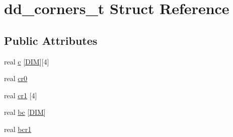 \hypertarget{structdd__corners__t}{\section{dd\-\_\-corners\-\_\-t \-Struct \-Reference}
\label{structdd__corners__t}
}
\subsection*{\-Public \-Attributes}
\begin{DoxyCompactItemize}
\item 
real \hyperlink{structdd__corners__t_a7a866a0d1a1e47f534f74f748600adc1}{c} \mbox{[}\hyperlink{share_2template_2gromacs_2types_2simple_8h_ac25189db92959bff3c6c2adf4c34b50a}{\-D\-I\-M}\mbox{]}\mbox{[}4\mbox{]}
\item 
real \hyperlink{structdd__corners__t_aba389aeb3fabf156a3b8e02bd1be0159}{cr0}
\item 
real \hyperlink{structdd__corners__t_a5f5f84610ade2c8926f615e0a679fc49}{cr1} \mbox{[}4\mbox{]}
\item 
real \hyperlink{structdd__corners__t_a234b7f0bcfb7bf6ce5993ca3d1cf56ca}{bc} \mbox{[}\hyperlink{share_2template_2gromacs_2types_2simple_8h_ac25189db92959bff3c6c2adf4c34b50a}{\-D\-I\-M}\mbox{]}
\item 
real \hyperlink{structdd__corners__t_a2126969ac702e536abd1492f13c290c9}{bcr1}
\end{DoxyCompactItemize}


